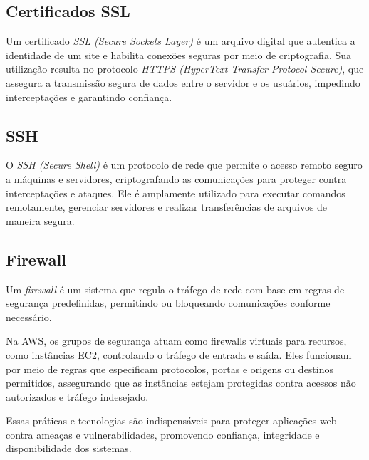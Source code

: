 \subsection{Certificados SSL}


Um certificado \emph{SSL (Secure Sockets Layer)} é um arquivo digital que autentica a identidade de um site e habilita conexões seguras por meio de criptografia. Sua utilização resulta no protocolo \emph{HTTPS (HyperText Transfer Protocol Secure)}, que assegura a transmissão segura de dados entre o servidor e os usuários, impedindo interceptações e garantindo confiança.

\subsection{SSH}


O \emph{SSH (Secure Shell)} é um protocolo de rede que permite o acesso remoto seguro a máquinas e servidores, criptografando as comunicações para proteger contra interceptações e ataques. Ele é amplamente utilizado para executar comandos remotamente, gerenciar servidores e realizar transferências de arquivos de maneira segura.

\subsection{Firewall}


Um \emph{firewall} é um sistema que regula o tráfego de rede com base em regras de segurança predefinidas, permitindo ou bloqueando comunicações conforme necessário.

Na AWS, os grupos de segurança atuam como firewalls virtuais para recursos, como instâncias EC2, controlando o tráfego de entrada e saída. Eles funcionam por meio de regras que especificam protocolos, portas e origens ou destinos permitidos, assegurando que as instâncias estejam protegidas contra acessos não autorizados e tráfego indesejado.

Essas práticas e tecnologias são indispensáveis para proteger aplicações web contra ameaças e vulnerabilidades, promovendo confiança, integridade e disponibilidade dos sistemas.









